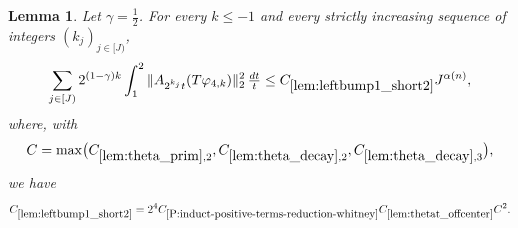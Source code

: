 \documentclass[12pt,reqno]{amsart}
\theoremstyle{plain}
\newtheorem{lemma}[theorem]{Lemma}
\numberwithin{equation}{section}
\theoremstyle{remark}
\newcommand{\uses}[1]{}
\newcommand{\usesdefs}[1]{}
\begin{document}
\begin{lemma}\label{lem:leftbump1_short2}\uses{Extension of sequences,A to Lambda,lem:theta_prim,lem:theta_decay,lem:thetat_offcenter,P:induct-positive-terms-reduction-whitney,lem:int_fct,lem:phi4_supp,lem:ft_deriv_mul}\usesdefs{A_def,bracket bump,normalized function tuples,auto:prism-form-definition,multiplicatively spaced monotone sequences,defn:window based bump functions}
Let $\gamma=\frac12$. For every $k\le-1$ and every strictly increasing sequence of integers $(k_j)_{j\in[J)}$,
\begin{equation}\label{auto:left-bump-one-short-two-bound}
\sum_{j\in[J)}2^{(1-\gamma)k}\int_1^2
\|A_{2^{k_j}t}(T\varphi_{4,k})\|_2^2\,\tfrac{dt}{t}
\le C_{\ref{lem:leftbump1_short2}}J^{\alpha(n)},
\end{equation}
where, with
\begin{equation}\label{auto:left-bump-one-short-two-auxiliary-constant}
C=\max\bigl(C_{\ref{lem:theta_prim},2},C_{\ref{lem:theta_decay},2},C_{\ref{lem:theta_decay},3}\bigr),
\end{equation}
we have
\begin{equation}\label{auto:left-bump-one-short-two-constant-definition}
C_{\ref{lem:leftbump1_short2}}
=2^4C_{\ref{P:induct-positive-terms-reduction-whitney}}
C_{\ref{lem:thetat_offcenter}}C^2.
\end{equation}
\end{lemma}
\end{document}
